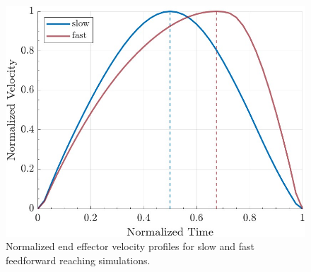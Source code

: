 \documentclass[letterpaper, 10pt, conference]{ieeeconf}
\begin{document}

\begin{figure}[h]
    \centering
    \includegraphics[width=1\linewidth]{images/single_slow_fast.jpg}
    \caption{Normalized end effector velocity profiles for slow and fast feedforward reaching simulations.}
    \label{fig:VelocityFeedforward}
\end{figure}

\end{document}
